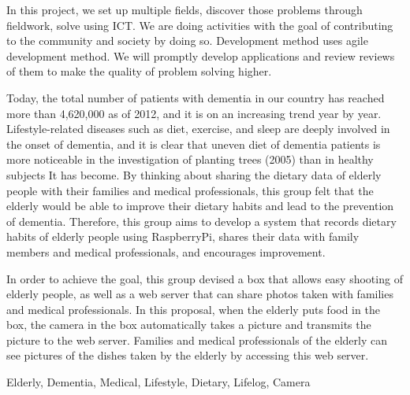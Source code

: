 \documentclass[../report]{subfiles}
\begin{document}
\begin{eabstract}
In this project, we set up multiple fields, discover those problems through fieldwork, solve using ICT.
We are doing activities with the goal of contributing to the community and society by doing so.
Development method uses agile development method.
We will promptly develop applications and review reviews of them to make the quality of problem solving higher.

Today, the total number of patients with dementia in our country has reached more than 4,620,000 as of 2012, and it is on an increasing trend year by year.
Lifestyle-related diseases such as diet, exercise, and sleep are deeply involved in the onset of dementia, and it is clear that uneven diet of dementia patients is more noticeable in the investigation of planting trees (2005) than in healthy subjects It has become.
By thinking about sharing the dietary data of elderly people with their families and medical professionals, this group felt that the elderly would be able to improve their dietary habits and lead to the prevention of dementia.
Therefore, this group aims to develop a system that records dietary habits of elderly people using RaspberryPi, shares their data with family members and medical professionals, and encourages improvement.

In order to achieve the goal, this group devised a box that allows easy shooting of elderly people, as well as a web server that can share photos taken with families and medical professionals.
In this proposal, when the elderly puts food in the box, the camera in the box automatically takes a picture and transmits the picture to the web server.
Families and medical professionals of the elderly can see pictures of the dishes taken by the elderly by accessing this web server.
\begin{ekeyword}
Elderly, Dementia, Medical, Lifestyle, Dietary, Lifelog, Camera
\end{ekeyword}
\end{eabstract}
\end{document}
